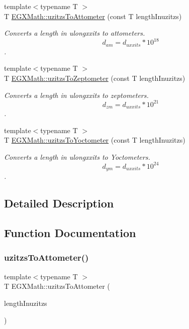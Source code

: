 \begin{DoxyCompactItemize}
{\footnotesize template$<$typename T $>$ }\\T \mbox{\hyperlink{group___e_g_x_math-_conversions-_length_conversions-uzitzs-_s_i_ga33c3f00e9fadcd52f2c0bfbd71a33d2b}{E\+G\+X\+Math\+::uzitzs\+To\+Attometer}} (const T length\+Inuzitzs)
\begin{DoxyCompactList}\small\item\em Converts a length in ulongxxits to attometers. \[ d_{am}=d_{uxxits} * 10^{18} \]. \end{DoxyCompactList}\item 
{\footnotesize template$<$typename T $>$ }\\T \mbox{\hyperlink{group___e_g_x_math-_conversions-_length_conversions-uzitzs-_s_i_ga9057f57c3f49216e6272c6f0f29ded62}{E\+G\+X\+Math\+::uzitzs\+To\+Zeptometer}} (const T length\+Inuzitzs)
\begin{DoxyCompactList}\small\item\em Converts a length in ulongxxits to zeptometers. \[ d_{zm}=d_{uxxits} * 10^{21} \]. \end{DoxyCompactList}\item 
{\footnotesize template$<$typename T $>$ }\\T \mbox{\hyperlink{group___e_g_x_math-_conversions-_length_conversions-uzitzs-_s_i_gae0faf7639d852bfde8863b3615aa096a}{E\+G\+X\+Math\+::uzitzs\+To\+Yoctometer}} (const T length\+Inuzitzs)
\begin{DoxyCompactList}\small\item\em Converts a length in ulongxxits to Yoctometers. \[ d_{ym}=d_{uxxits} * 10^{24} \]. \end{DoxyCompactList}\end{DoxyCompactItemize}


\subsection{Detailed Description}


\subsection{Function Documentation}
\mbox{\label{group___e_g_x_math-_conversions-_length_conversions-uzitzs-_s_i_ga33c3f00e9fadcd52f2c0bfbd71a33d2b}} 
\subsubsection{\texorpdfstring{uzitzs\+To\+Attometer()}{uzitzsToAttometer()}}
{\footnotesize\ttfamily template$<$typename T $>$ \\
T E\+G\+X\+Math\+::uzitzs\+To\+Attometer (\begin{DoxyParamCaption}\item[{const T}]{length\+Inuzitzs }\end{DoxyParamCaption})}




